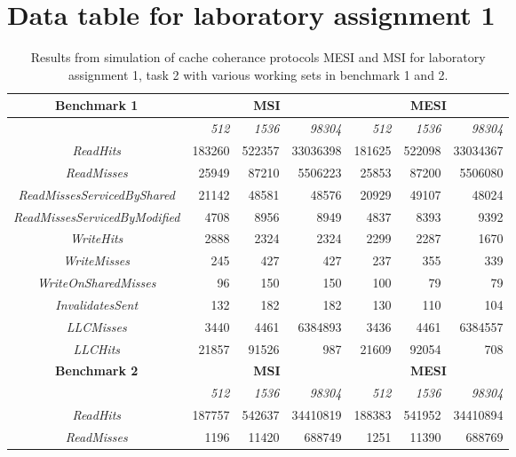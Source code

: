 \section{Data table for laboratory assignment 1}
\begin{table}[h]
	\caption{\label{tbl:lab1:task2}Results from simulation of cache coherance protocols MESI and MSI for laboratory assignment 1, task 2 with various working sets in benchmark 1 and 2.}
    \begin{adjustwidth}{-2cm}{-2cm}  
        \begin{center}

			\begin{tabular}{| c | r r r | r r r|}
				\textbf{Benchmark 1}& \multicolumn{3}{c|}{\textbf{MSI}} & \multicolumn{3}{c|}{\textbf{MESI}} \\
				\hline
				&\textit{512}&\textit{1536}&\textit{98304}&\textit{512}&\textit{1536}&\textit{98304}\\
				\hline
				\textit{ReadHits} & 183260 & 522357 & 33036398 & 181625 & 522098 & 33034367 \\
				\textit{ReadMisses} & 25949 & 87210 & 5506223 & 25853 & 87200 & 5506080\\ 
				\textit{ReadMissesServicedByShared} & 21142 & 48581 & 48576 & 20929 & 49107 & 48024 \\ 
				\textit{ReadMissesServicedByModified} & 4708 & 8956 & 8949 & 4837 & 8393 & 9392\\ 
				\textit{WriteHits} & 2888 & 2324 & 2324 & 2299 & 2287 & 1670 \\ 
				\textit{WriteMisses} & 245 & 427 & 427 & 237 & 355 & 339 \\ 
				\textit{WriteOnSharedMisses} & 96 & 150 & 150 & 100 & 79 & 79 \\ 
				\textit{InvalidatesSent} & 132 & 182 & 182 & 130 & 110 & 104 \\ 
				\textit{LLCMisses} & 3440 & 4461 & 6384893 & 3436 & 4461 & 6384557 \\ 
				\textit{LLCHits} & 21857 & 91526 & 987 & 21609 & 92054 & 708 \\
				\hline
			\textbf{Benchmark 2}& \multicolumn{3}{c|}{\textbf{MSI}} & \multicolumn{3}{c|}{\textbf{MESI}} \\
				\hline
				&\textit{512}&\textit{1536}&\textit{98304}&\textit{512}&\textit{1536}&\textit{98304}\\
				\hline
				\textit{ReadHits} & 187757 & 542637 & 34410819 & 188383 & 541952 & 34410894 \\
				\textit{ReadMisses} & 1196 & 11420 & 688749 & 1251 & 11390 & 688769 \\

\end{tabular}
\end{center}
\end{adjustwidth}
\end{table}
